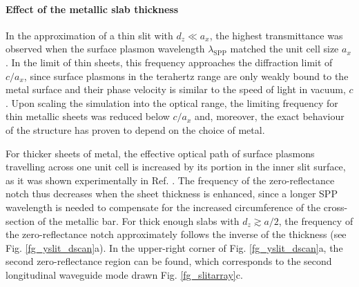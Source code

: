 \paragraph{Effect of the metallic slab thickness}%

In the approximation of a thin slit with $d_z \ll a_x$, the highest transmittance was observed when the surface plasmon wavelength $\lambda_{\text{SPP}}$ matched the unit cell size $a_x$. 
In the limit of thin sheets, this frequency approaches the diffraction limit of $c/a_x$, since surface plasmons in the terahertz range are only weakly bound to the metal surface and their phase velocity is similar to the speed of light in vacuum, $c$. Upon scaling the simulation into the optical range, the limiting frequency for thin metallic sheets was reduced below $c/a_x$ and, moreover, the exact behaviour of the structure has proven to depend on the choice of metal.

For thicker sheets of metal, the effective optical path of surface plasmons travelling across one unit cell is increased by its portion in the inner slit surface, as it was shown experimentally in Ref. \cite{weiner2011electromagnetics}. The frequency of the zero-reflectance notch thus decreases when the sheet thickness is enhanced, since a longer SPP wavelength is needed to compensate for the increased circumference of the cross-section of the metallic bar. 
For thick enough slabs with $d_z \gtrsim a/2$, the frequency of the zero-reflectance notch approximately follows the inverse of the thickness (see Fig. \ref{fg_yslit_dscan}a). 
In the upper-right corner of Fig. \ref{fg_yslit_dscan}a, the second zero-reflectance region can be found, which corresponds to the second longitudinal waveguide mode drawn Fig. \ref{fg_slitarray}c. %

